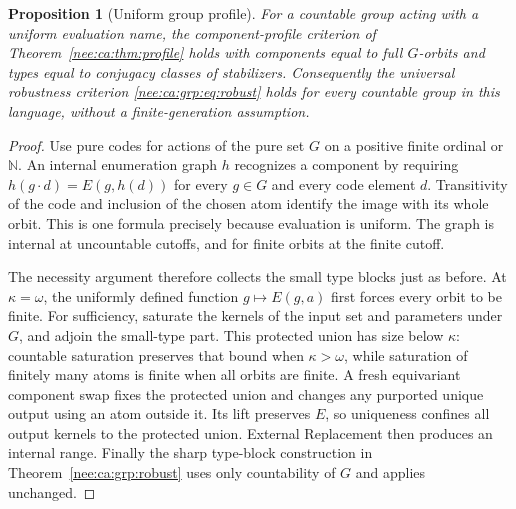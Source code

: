 \documentclass[11pt,letterpaper]{article}
\numberwithin{equation}{section}
\theoremstyle{plain}
\newtheorem{proposition}[proposition]{Proposition}
\theoremstyle{definition}
\theoremstyle{remark}
\newcommand{\NN}{\mathbb N}
\begin{document}
\begin{proposition}[Uniform group profile]\label{nee:ca:uni:profile}
For a countable group acting with a uniform evaluation name, the
component-profile criterion of Theorem~\ref{nee:ca:thm:profile} holds with
components equal to full $G$-orbits and types equal to conjugacy classes
of stabilizers.  Consequently the universal robustness criterion
\eqref{nee:ca:grp:eq:robust} holds for every countable group in this language,
without a finite-generation assumption.
\end{proposition}
\begin{proof}
Use pure codes for actions of the pure set $G$ on a positive finite
ordinal or $\NN$.  An internal enumeration graph $h$ recognizes a
component by requiring
$h(g\cdot d)=E(g,h(d))$ for every $g\in G$ and every code element $d$.
Transitivity of the code and inclusion of the chosen atom identify
the image with its whole orbit.  This is one formula precisely because
evaluation is uniform.  The graph is internal at uncountable cutoffs,
and for finite orbits at the finite cutoff.

The necessity argument therefore collects the small type blocks just
as before.  At $\kappa=\omega$, the uniformly defined function
$g\mapsto E(g,a)$ first forces every orbit to be finite.  For
sufficiency, saturate the kernels of the input set and parameters
under $G$, and adjoin the small-type part.  This protected union has
size below $\kappa$: countable saturation preserves that bound when
$\kappa>\omega$, while saturation of finitely many atoms is finite
when all orbits are finite.  A fresh equivariant component swap fixes
the protected union and changes any purported unique output using an
atom outside it.  Its lift preserves $E$, so uniqueness confines all
output kernels to the protected union.  External Replacement then
produces an internal range.  Finally the sharp type-block construction
in Theorem~\ref{nee:ca:grp:robust} uses only countability of $G$ and applies
unchanged.
\end{proof}
\end{document}
